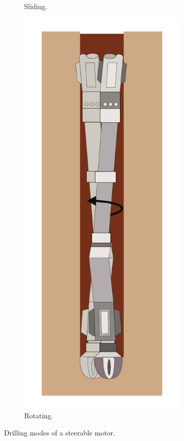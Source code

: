 \begin{figure}[ht]
\begin{subfigure}[b]{0.15\textwidth}
		\caption{\label{fig:drillingmode1}Sliding.}
	\end{subfigure}
	\begin{subfigure}[b]{0.15\textwidth}
		\includegraphics[width=0.9\textwidth]{img/drillingmode2.pdf}
		\caption{\label{fig:drillingmode2}Rotating.}
	\end{subfigure}
	\caption{\label{fig:drillingmodes}Drilling modes of a steerable motor.}
\end{figure}

